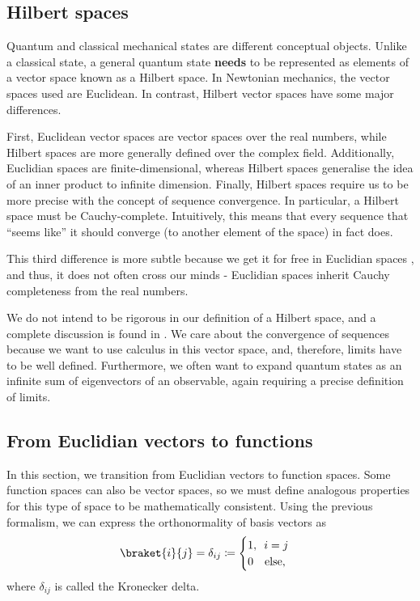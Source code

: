 \subsection{Hilbert spaces}
Quantum and classical mechanical states are different conceptual objects. Unlike a classical state, a general quantum state \textbf{needs} to be represented as elements of a vector space known as a Hilbert space. In Newtonian mechanics, the vector spaces used are Euclidean. In contrast, Hilbert vector spaces have some major differences.

First, Euclidean vector spaces are vector spaces over the real numbers, while Hilbert spaces are more generally defined over the complex field.
Additionally, Euclidian spaces are finite-dimensional, whereas Hilbert spaces generalise the idea of an inner product to infinite dimension.
Finally, Hilbert spaces require us to be more precise with the concept of sequence convergence. In particular, a Hilbert space must be Cauchy-complete. Intuitively, this means that every sequence that ``seems like'' it should converge (to another element of the space) in fact does. 

This third difference is more subtle because we get it for free in Euclidian spaces \cite{rudin}, and thus, it does not often cross our minds - Euclidian spaces inherit Cauchy completeness from the real numbers.

We do not intend to be rigorous in our definition of a Hilbert space, and a complete discussion is found in \cite{rudin}. We care about the convergence of sequences because we want to use calculus in this vector space, and, therefore, limits have to be well defined. Furthermore, we often want to expand quantum states as an infinite sum of eigenvectors of an observable, again requiring a precise definition of limits.

\subsection{From Euclidian vectors to functions}
In this section, we transition from Euclidian vectors to function spaces. Some function spaces can also be vector spaces, so we must define analogous properties for this type of space to be mathematically consistent. Using the previous formalism, we can express the orthonormality of basis vectors as 
\begin{align*}
    \braket{i}{j} = \delta_{ij} \coloneqq \begin{cases}
        1, \enspace i=j\\
        0  \enspace\enspace \text{else},
    \end{cases}
\end{align*}
where $\delta_{ij}$ is called the Kronecker delta. 

